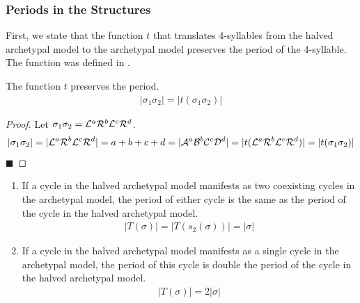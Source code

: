 \subsubsection{Periods in the  Structures}

First, we state that the function $t$ that translates 4-syllables from the halved archetypal model to the archetypal model preserves the period of the 4-syllable.
The function was defined in .

\begin{lemma}
	\label{lemma:t.preserves.period}
	The function $t$ preserves the period.
	\begin{align}
		|\sigma_1\sigma_2| = |t(\sigma_1\sigma_2)|
	\end{align}
\end{lemma}

\begin{proof}
	Let $\sigma_1\sigma_2 = \mathcal{L}^a\mathcal{R}^b\mathcal{L}^c\mathcal{R}^d$.
	\begin{align*}
		|\sigma_1\sigma_2| =  |\mathcal{L}^a\mathcal{R}^b\mathcal{L}^c\mathcal{R}^d|
		= a + b + c + d
		= |\mathcal{A}^a\mathcal{B}^b\mathcal{C}^c\mathcal{D}^d|
		= |t(\mathcal{L}^a\mathcal{R}^b\mathcal{L}^c\mathcal{R}^d)|
		= |t(\sigma_1\sigma_2)|
	\end{align*}
	\hfill $\blacksquare$
\end{proof}

\begin{theorem}
	\label{theorem:period.pal}
	\begin{enumerate}
		\item If a cycle in the halved archetypal model manifests as two coexisting cycles in the archetypal model, the period of either cycle is the same as the period of the cycle in the halved archetypal model.
		      \begin{align}
			      |T(\sigma)| = |T(s_2(\sigma))| = |\sigma|
		      \end{align}
		\item If a cycle in the halved archetypal model manifests as a single cycle in the archetypal model, the period of this cycle is double the period of the cycle in the halved archetypal model.
		      \begin{align}
			      |T(\sigma)| = 2 |\sigma|
		      \end{align}
	\end{enumerate}
\end{theorem}

